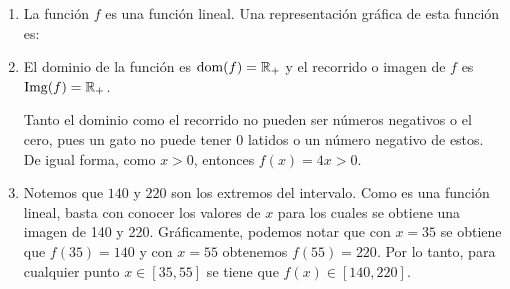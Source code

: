 \documentclass[11pt,respuestas,a4]{aleph-examen}
\begin{document}
\begin{preguntas}
\begin{respuesta}
\begin{enumerate}[label=\textit{\alph*)}]
    \item 
        La función $f$ es una función lineal. Una representación gráfica de esta función es:
        \begin{center}
        \end{center}
    
    \item 
        El dominio de la función es $\operatorname{dom}(f) = \mathbb{R}_+$ y el recorrido o imagen de $f$ es $\operatorname{Img}(f) = \mathbb{R}_+$.
    
        Tanto el dominio como el recorrido no pueden ser números negativos o el cero, pues un gato no puede tener $0$ latidos o un número negativo de estos. De igual forma, como $x > 0$, entonces $f(x) = 4x > 0$. 
    
    \item 
        Notemos que $140$ y $220$ son los extremos del intervalo. Como es una función lineal, basta con conocer los valores de $x$ para los cuales se obtiene una imagen de 140 y 220. Gráficamente, podemos notar que con $x = 35$ se obtiene que $f(35) = 140$ y con $x = 55$ obtenemos $f(55) = 220$. Por lo tanto, para cualquier punto $x \in [35,55]$ se tiene que $f(x) \in [140,220]$.\qedhere
\end{enumerate}
\end{respuesta}


\end{preguntas}
\end{document}
